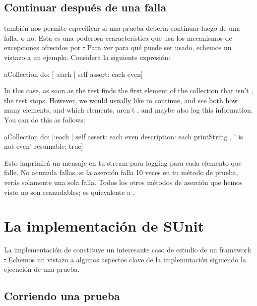 \documentclass[a4paper,10pt,twoside]{book}
\begin{document}
\subsection{Continuar despu\'es de una falla}

\sunit tambi\'en nos permite especificar si una prueba deber\'ia continuar luego de una falla, o no. 
Esta es una poderosa ccaracter\'istica que usa los mecanismos de excepciones ofrecidos por \st.
Para ver para qu\'e puede ser usado, echemos un vistazo a un ejemplo. Considera la siguiente expresi\'on:

\begin{code}{}
aCollection do: [ :each | self assert: each even]
\end{code}
In this case, as soon as the test finds the first element of the collection that isn't
, the test stops. 
However, we would usually like to
continue, and see both how many elements, and which elements, aren't
, and maybe also log this information.  You can do this
as follows:
\begin{code}{}
aCollection do:
	[:each |
	self
		assert: each even
		description: each printString , ' is not even'
		resumable: true]
\end{code}

Esto imprimir\'a un mensaje en tu stream para logging para cada elemento que falle.
No acumula fallas, \ir si la aserci\'on falla 10 veces en tu m\'etodo de prueba, ver\'as solamente una sola falla.
Todos los otros m\'etodos de aserci\'on que hemos visto no son reanudables;
 es quievalente a .
\section{La implementaci\'on de SUnit}

La implementaci\'on de \sunit constituye un interesante caso de estudio de un framework \st. 
Echemos un vistazo a algunos aspectos clave de la implemntaci\'on siguiendo la ejecuci\'on de una prueba.

\subsection{Corriendo una prueba}
\end{document}
